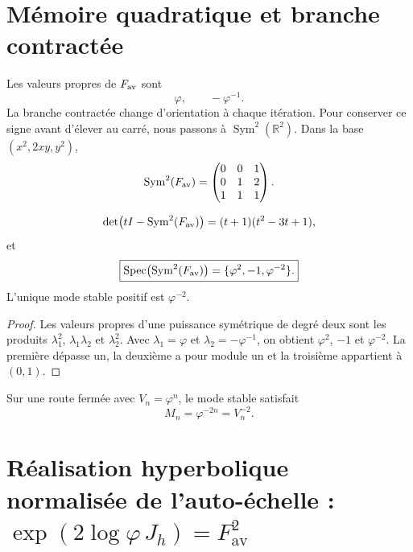 \section{Mémoire quadratique et branche contractée}

Les valeurs propres de \(F_{\rm av}\) sont
\[
 \varphi,
 \qquad
 -\varphi^{-1}.
\]
La branche contractée change d’orientation à chaque itération. Pour conserver
ce signe avant d’élever au carré, nous passons à
\(\operatorname{Sym}^2(\mathbb R^2)\). Dans la base
\((x^2,2xy,y^2)\),
\begin{equation}
 \operatorname{Sym}^2(F_{\rm av})=
 \begin{pmatrix}
 0&0&1\\
 0&1&2\\
 1&1&1
 \end{pmatrix}.
 \label{gfp:b:eq:sym2-Fav-phi}
\end{equation}

\begin{theorem}
\label{gfp:b:thm:espectro-sym2-phi}
\[
 \det\bigl(tI-\operatorname{Sym}^2(F_{\rm av})\bigr)
 =(t+1)(t^2-3t+1),
\]
et
\begin{equation}
 \boxed{
 \operatorname{Spec}\bigl(\operatorname{Sym}^2(F_{\rm av})\bigr)
 =\{\varphi^2,-1,\varphi^{-2}\}.}
 \label{gfp:b:eq:espectro-sym2-phi}
\end{equation}
L’unique mode stable positif est \(\varphi^{-2}\).
\end{theorem}

\begin{proof}
Les valeurs propres d’une puissance symétrique de degré deux sont les produits
\(\lambda_1^2\), \(\lambda_1\lambda_2\) et \(\lambda_2^2\). Avec
\(\lambda_1=\varphi\) et \(\lambda_2=-\varphi^{-1}\), on obtient
\(\varphi^2\), \(-1\) et \(\varphi^{-2}\). La première dépasse un, la
deuxième a pour module un et la troisième appartient à \((0,1)\).
\end{proof}

Sur une route fermée avec \(V_n=\varphi^n\), le mode stable satisfait
\begin{equation}
 \boxed{M_n=\varphi^{-2n}=V_n^{-2}.}
 \label{gfp:b:eq:modo-estable-phi}
\end{equation}

\section{Réalisation hyperbolique normalisée de l’auto-échelle : \(\exp(2\log\varphi\,J_h)=F_{\mathrm{av}}^2\)}

